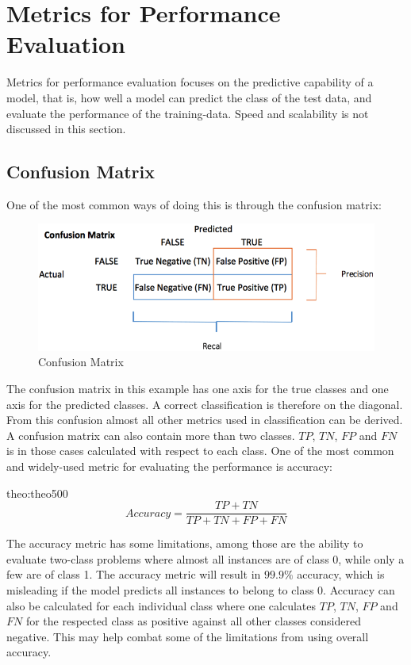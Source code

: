 \section{Metrics for Performance Evaluation}
Metrics for performance evaluation focuses on the predictive capability of a model, that is, how well a model can predict the class of the test data, and evaluate the performance of the training-data.
Speed and scalability is not discussed in this section.

\subsection{Confusion Matrix}
One of the most common ways of doing this is through the confusion matrix:

\bigskip
\begin{figure}[H]
    \centering
    \includegraphics[scale=0.5]{figures/confusionmatrix.png}
    \caption{Confusion Matrix}
\end{figure}

The confusion matrix in this example has one axis for the true classes 
and one axis for the predicted classes. A correct classification is 
therefore on the diagonal. From this confusion almost all other metrics 
used in classification can be derived. A confusion matrix can also contain 
more than two classes. $TP$, $TN$, $FP$ and $FN$ is in those cases calculated
with respect to each class. One of the most common and 
widely-used metric for evaluating the performance is accuracy:

\begin{theo}[]{theo:theo500}
    \label{eq:accuracy}
        \[
            Accuracy = \frac{TP + TN}{TP + TN + FP + FN}
        \]
\end{theo}

The accuracy metric has some limitations, among those are the ability to evaluate two-class problems where almost all instances are of class 0, while only a few are of class 1.
The accuracy metric will result in $99.9\%$ accuracy, which is misleading if the model predicts all instances to belong to class 0.
Accuracy can also be calculated for each individual class where one calculates
$TP$, $TN$, $FP$ and $FN$ for the respected class as positive 
against all other classes considered negative. This may help combat some of
the limitations from using overall accuracy.

